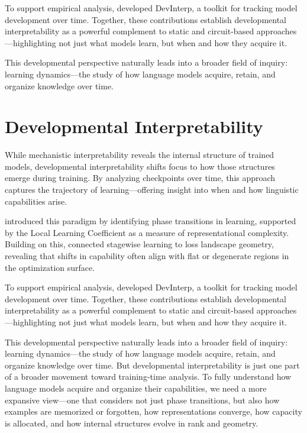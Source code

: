 To support empirical analysis, \citet{devinterpcode} developed DevInterp, a toolkit for tracking model development over time. Together, these contributions establish developmental interpretability as a powerful complement to static and circuit-based approaches—highlighting not just what models learn, but when and how they acquire it.

This developmental perspective naturally leads into a broader field of inquiry: learning dynamics—the study of how language models acquire, retain, and organize knowledge over time.

\section{Developmental Interpretability}
While mechanistic interpretability reveals the internal structure of trained models, developmental interpretability shifts focus to how those structures emerge during training. By analyzing checkpoints over time, this approach captures the trajectory of learning—offering insight into when and how linguistic capabilities arise.

\citet{hoogland2023towards} introduced this paradigm by identifying phase transitions in learning, supported by the Local Learning Coefficient as a measure of representational complexity. Building on this, \citet{hoogland2025losslandscape} connected stagewise learning to loss landscape geometry, revealing that shifts in capability often align with flat or degenerate regions in the optimization surface.

To support empirical analysis, \citet{devinterpcode} developed DevInterp, a toolkit for tracking model development over time. Together, these contributions establish developmental interpretability as a powerful complement to static and circuit-based approaches—highlighting not just what models learn, but when and how they acquire it.

This developmental perspective naturally leads into a broader field of inquiry: learning dynamics—the study of how language models acquire, retain, and organize knowledge over time. But developmental interpretability is just one part of a broader movement toward training-time analysis. To fully understand how language models acquire and organize their capabilities, we need a more expansive view—one that considers not just phase transitions, but also how examples are memorized or forgotten, how representations converge, how capacity is allocated, and how internal structures evolve in rank and geometry.

